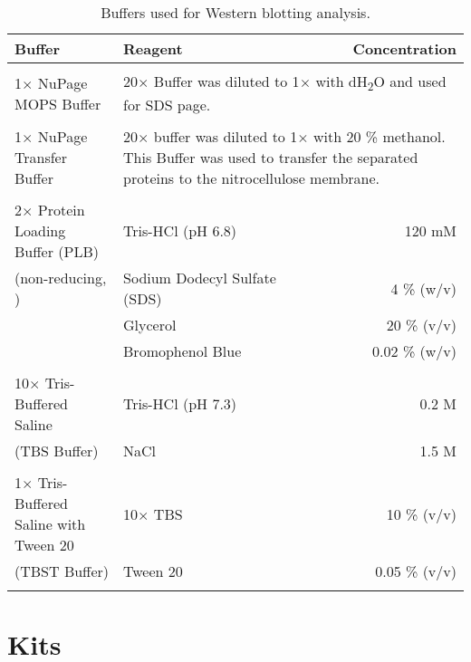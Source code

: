\begin{table}[H]
\begin{tabular}{l l r}
\textbf{Buffer} & \textbf{Reagent} & \textbf{Concentration}\\
\hline
\\
1$\times$ NuPage MOPS Buffer & \multicolumn{2}{p{8cm}}{20$\times$ Buffer was diluted to 1$\times$ with dH\textsubscript{2}O and used for SDS page.} \\
\\
1$\times$ NuPage Transfer Buffer & \multicolumn{2}{p{8cm}}{20$\times$ buffer was diluted to 1$\times$ with 20 \% methanol. This Buffer was used to transfer the separated proteins to the nitrocellulose membrane.} \\
\\
2$\times$ Protein Loading Buffer (PLB) & Tris-HCl (pH 6.8) & 120 mM \\
(non-reducing, \cite{pmid5432063}) & Sodium Dodecyl Sulfate (SDS) & 4 \% (w/v)\\
& Glycerol & 20 \% (v/v) \\
& Bromophenol Blue & 0.02 \% (w/v)\\
\\
10$\times$ Tris-Buffered Saline & Tris-HCl (pH 7.3) & 0.2 M \\
(TBS Buffer) & NaCl & 1.5 M \\
\\
1$\times$ Tris-Buffered Saline with Tween 20 & 10$\times$ TBS & 10 \% (v/v) \\
(TBST Buffer) & Tween 20 & 0.05 \% (v/v)\\ 
\\
\end{tabular}

\caption[Western blot buffers]{Buffers used for Western blotting analysis.}
\label{Western blot}
\end{table}




\section{Kits}

